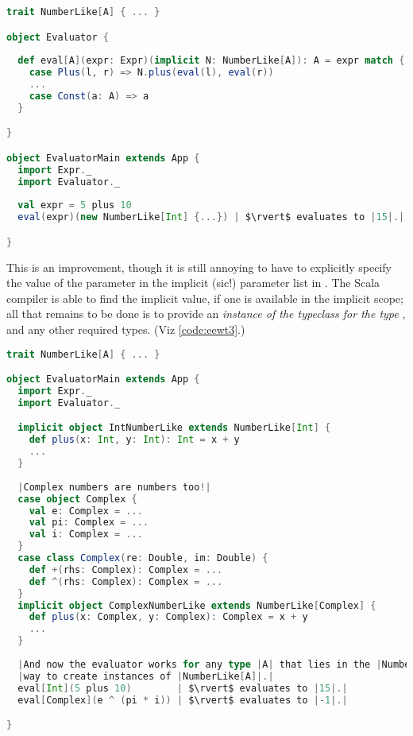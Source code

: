 \documentclass[10 pt]{article}
\begin{document}
\begin{lstlisting}[caption={Expression evaluator without typeclasses}, label={code:eewt2}, language=Scala, escapechar=|]
trait NumberLike[A] { ... }

object Evaluator {
 
  def eval[A](expr: Expr)(implicit N: NumberLike[A]): A = expr match {
    case Plus(l, r) => N.plus(eval(l), eval(r))
    ...
    case Const(a: A) => a
  }

}

object EvaluatorMain extends App {
  import Expr._
  import Evaluator._
  
  val expr = 5 plus 10
  eval(expr)(new NumberLike[Int] {...}) | $\rvert$ evaluates to |15|.|

}
\end{lstlisting}

This is an improvement, though it is still annoying to have to explicitly specify the value of the  parameter in the implicit (sic!) parameter list in . The Scala compiler is able to find the implicit value, if one is available in the implicit scope; all that remains to be done is to provide an \emph{instance of the  typeclass for the type }, and any other required types. (Viz \autoref{code:eewt3}.)

\begin{lstlisting}[caption={Expression evaluator without typeclasses}, label={code:eewt3}, language=Scala, escapechar=|]
trait NumberLike[A] { ... }

object EvaluatorMain extends App {
  import Expr._
  import Evaluator._

  implicit object IntNumberLike extends NumberLike[Int] {
    def plus(x: Int, y: Int): Int = x + y
    ...
  }
  
  |Complex numbers are numbers too!|
  case object Complex {
    val e: Complex = ...
    val pi: Complex = ...
    val i: Complex = ...
  }
  case class Complex(re: Double, im: Double) {
    def +(rhs: Complex): Complex = ...
    def ^(rhs: Complex): Complex = ...
  }
  implicit object ComplexNumberLike extends NumberLike[Complex] {
    def plus(x: Complex, y: Complex): Complex = x + y
    ...
  }
  
  |And now the evaluator works for any type |A| that lies in the |NumberLike| typeclass; i.e. where there is an in-scope|
  |way to create instances of |NumberLike[A]|.|
  eval[Int](5 plus 10)        | $\rvert$ evaluates to |15|.|
  eval[Complex](e ^ (pi * i)) | $\rvert$ evaluates to |-1|.|

}
\end{lstlisting}
\end{document}
